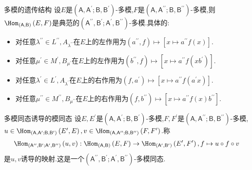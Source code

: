 \begin{proposition}{多模的遗传结构}{}
	设$E$是$\left(\mathsf{A},\mathsf{A}^{\prime};\mathsf{B},\mathsf{B}^{\prime}\right)$-多模,$F$是$\left(\mathsf{A},\mathsf{A}^{\prime\prime};\mathsf{B},\mathsf{B}^{\prime\prime}\right)$-多模,则$\Hom_{\left(\mathsf{A},\mathsf{B}\right)}\left(E,F\right)$是典范的$\left(\mathsf{A}^{\prime\prime},\mathsf{B}^{\prime};\mathsf{A}^{\prime},\mathsf{B}^{\prime\prime}\right)$-多模.具体的:
	\begin{itemize}
		\item 对任意$\lambda^{\prime\prime}\in L^{\prime\prime},A_{\lambda^{\prime\prime}}$在$E$上的左作用为$\left(a^{\prime\prime},f\right)\mapsto\left[x\mapsto a^{\prime\prime}f\left(x\right)\right]$.
		\item 对任意$\mu^{\prime}\in M^{\prime},B_{\mu^{\prime}}$在$E$上的左作用为$\left(b^{\prime\prime},f\right)\mapsto\left[x\mapsto a^{\prime\prime}f\left(xb^{\prime}\right)\right]$.
		\item 对任意$\lambda^{\prime}\in L^{\prime},A_{\lambda^{\prime}}$在$E$上的右作用为$\left(f,a^{\prime}\right)\mapsto\left[x\mapsto a^{\prime\prime}f\left(a^{\prime}x\right)\right]$.
		\item 对任意$\mu^{\prime\prime}\in M^{\prime\prime},B_{\mu^{\prime\prime}}$在$E$上的右作用为$\left(f,b^{\prime\prime}\right)\mapsto\left[x\mapsto a^{\prime\prime}f\left(x\right)b^{\prime\prime}\right]$.
	\end{itemize}
\end{proposition}

\begin{definition}{多模同态诱导的模同态}{}
	设$E,E^{\prime}$是$\left(\mathsf{A},\mathsf{A}^{\prime};\mathsf{B},\mathsf{B}^{\prime}\right)$-多模,$F,F^{\prime}$是$\left(\mathsf{A},\mathsf{A}^{\prime\prime};\mathsf{B},\mathsf{B}^{\prime\prime}\right)$-多模,$u\in\Hom_{\left(\mathsf{A},\mathsf{A}^{\prime};\mathsf{B},\mathsf{B}^{\prime}\right)}\left(E^{\prime},E\right),v\in\Hom_{\left(\mathsf{A},\mathsf{A}^{\prime\prime};\mathsf{B},\mathsf{B}^{\prime\prime}\right)}\left(F,F^{\prime}\right)$.称
	\begin{align*}
		\Hom_{\left(\mathsf{A}^{\prime\prime},\mathsf{B}^{\prime};\mathsf{A}^{\prime},\mathsf{B}^{\prime\prime}\right)}\left(u,v\right):\Hom_{\left(\mathsf{A},\mathsf{B}\right)}\left(E,F\right)\to\Hom_{\left(\mathsf{A}^{\prime},\mathsf{B}^{\prime}\right)}\left(E^{\prime},F^{\prime}\right),f\mapsto u\circ f\circ v
	\end{align*}
	是$u,v$诱导的映射.这是一个$\left(\mathsf{A}^{\prime\prime},\mathsf{B}^{\prime};\mathsf{A}^{\prime},\mathsf{B}^{\prime\prime}\right)$-多模同态.
\end{definition}

